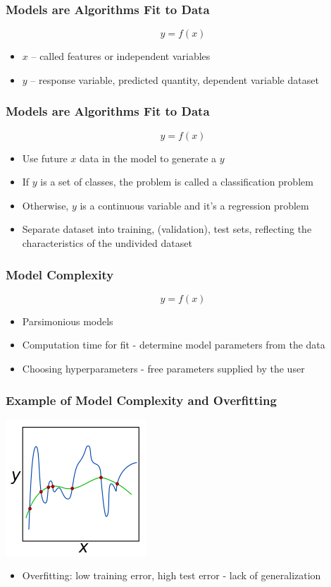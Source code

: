 \documentclass{beamer}
\begin{document}

\begin{frame}
\frametitle{Models are Algorithms Fit to Data}
\begin{equation}
y = f(x)
\end{equation}
\begin{itemize}
\item $x$ -- called features or independent variables
\item $y$ -- response variable, predicted quantity, dependent variable
dataset
\end{itemize}
\end{frame}

\begin{frame}
\frametitle{Models are Algorithms Fit to Data}
\begin{equation}
y = f(x)
\end{equation}
\begin{itemize}
\item Use future $x$ data in the model to generate a $y$
\item If $y$ is a set of classes, the problem is called a classification problem
\item Otherwise, $y$ is a continuous variable and it's a regression problem
\item Separate dataset into training, (validation), test sets, reflecting the characteristics of the undivided dataset \end{itemize}
\end{frame}

\begin{frame}
\frametitle{Model Complexity}
\begin{equation}
y = f(x)
\end{equation}
\begin{itemize}
\item Parsimonious models
\item Computation time for fit - determine model parameters from the data
\item Choosing hyperparameters - free parameters supplied by the user
\end{itemize}
\end{frame}

\begin{frame}
\frametitle{Example of Model Complexity and Overfitting}
\includegraphics{overfit}
\begin{itemize}
\item Overfitting: low training error, high test error - lack of generalization
\end{itemize}
\end{frame}
\end{document}
